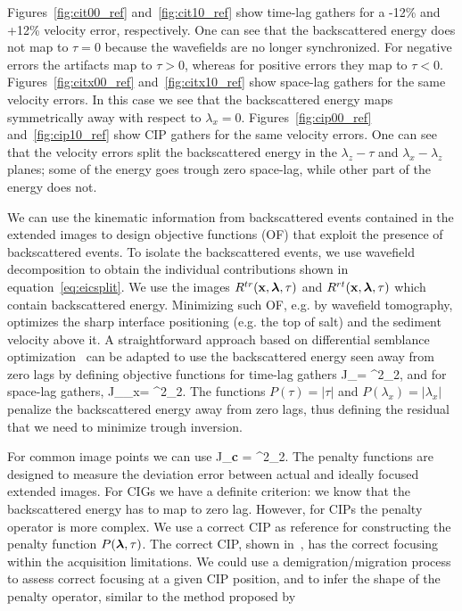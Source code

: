 Figures~\ref{fig:cit00_ref} and~\ref{fig:cit10_ref} show time-lag gathers for a -12\% and +12\% velocity error, respectively. One can see
that the backscattered energy does not map to $\tau=0$ because the wavefields are no longer synchronized. For negative errors the artifacts map to $\tau>0$, whereas
for positive errors they map to $\tau<0$. Figures~\ref{fig:citx00_ref} and~\ref{fig:citx10_ref} 
show space-lag gathers for the same velocity errors. In this case we see that the backscattered energy maps symmetrically away with respect to $\lambda_x=0$.
Figures~\ref{fig:cip00_ref} and~\ref{fig:cip10_ref} show CIP gathers for the same velocity errors.
One can see that the velocity errors split the backscattered energy in the $\lambda_z-\tau$ and $\lambda_x-\lambda_z$ planes; 
some of the energy goes trough zero space-lag, while other part of the energy does not.


We can use the kinematic information from backscattered events contained in the extended images 
to design objective functions (OF) that exploit the presence of backscattered events. To isolate the backscattered
events, we use wavefield decomposition to obtain the individual contributions shown in equation~\ref{eq:eicsplit}. We use the images
$R^{tr}({\bf x},{\boldsymbol{\lambda}},\tau)$ and $R^{rt}({\bf x},{\boldsymbol{\lambda}},\tau)$ which contain backscattered energy.
Minimizing such OF, e.g. by wavefield tomography, optimizes the sharp interface positioning (e.g. the top of salt) and the sediment velocity above it.
A straightforward approach based on differential semblance optimization~\citep{shen:2132} can be adapted to use
 the backscattered energy seen away from zero lags by defining objective functions for time-lag gathers
\beq
 J_{\tau}=  ^2_2,
\label{eq:of1}
\eeq 
and for space-lag gathers,
\beq
 J_{\lambda_x}=  ^2_2.
\label{eq:of2}
\eeq 
%
The functions $P(\tau)=|\tau|$ and $P(\lambda_x)=|\lambda_x|$ penalize the backscattered energy away 
from zero lags, thus defining the residual that we need to minimize trough inversion.

For common image points we can use
\beq
J_{\bf c} =   ^2_2.
\eeq
%
The penalty functions are designed to measure the deviation error between actual and ideally focused 
extended images. For CIGs we have a definite criterion: we know that the backscattered energy has to map
to zero lag. However, for CIPs the penalty operator is more complex. We use a correct CIP as reference for constructing the penalty function $P({\boldsymbol{\lambda}},\tau)$.
 The correct CIP, shown in~, has the correct focusing within the acquisition limitations.
We could use a demigration/migration process to assess correct focusing at a given CIP position, and to infer the shape of 
the penalty operator,  similar to the method proposed by~\cite{tony_seg:cwp12}

